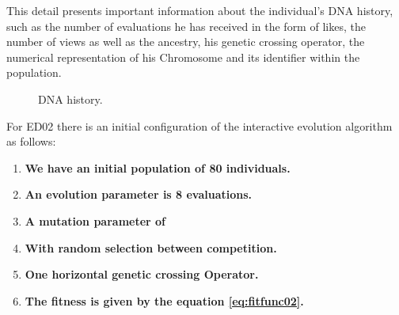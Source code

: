 This detail presents important information about the individual's DNA history,
such as the number of evaluations he has received in the form of likes, the
number of views as well as the ancestry, his genetic crossing operator, the
numerical representation of his Chromosome and its identifier within the
population.


\begin{figure}
\captionsetup{justification=centering,margin=2cm}
\centering
\setlength\fboxsep{0pt}
\setlength\fboxrule{0.7pt}
\caption{DNA history.}
\label{fig:dna}
\end{figure}

For ED02 there is an initial configuration of the interactive evolution algorithm as follows:

\begin{enumerate}
	\item  \textbf{We have an initial population of 80 individuals.}

	\item  \textbf{An evolution parameter is 8 evaluations.}

	\item  \textbf{A mutation parameter of }
	\item  \textbf{With random selection between competition.}
	\item  \textbf{One horizontal genetic crossing Operator.}
	\item  \textbf{The fitness is given by the equation \ref{eq:fitfunc02}.}
\end{enumerate}


